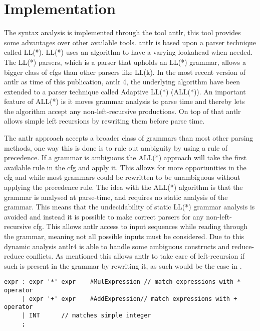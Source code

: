 
\section{Implementation}\label{sec:ANTLR}
The syntax analysis is implemented through the tool \acrfull{antlr}, this tool provides some advantages over other available tools.
\acrshort{antlr} is based upon a parser technique called LL(*).
LL(*) uses an algorithm to have a varying lookahead when needed.
The LL(*) parsers, which is a parser that upholds an LL(*) grammar, allows a bigger class of \acrshort{cfg}s than other parsers like LL(k).
In the most recent version of \acrshort{antlr} as time of this publication, \acrshort{antlr} 4, the underlying algorithm have been extended to a parser technique called Adaptive LL(*) (ALL(*)).
An important feature of ALL(*) is it moves grammar analysis to parse time and thereby lets the algorithm accept any non-left-recursive productions.
On top of that \acrshort{antlr} allows simple left recursions by rewriting them before parse time.

The \acrshort{antlr} approach accepts a broader class of grammars than most other parsing methods, one way this is done is to rule out ambiguity by using a rule of precedence.
If a grammar is ambiguous the ALL(*) approach will take the first  available rule in the \acrshort{cfg} and apply it.
This allows for more opportunities in the \acrshort{cfg} and while most grammars could be rewritten to be unambiguous without applying the precedence rule.
The idea with the ALL(*) algorithm is that the grammar is analysed  at parse-time, and requires no static analysis of the grammar. 
This means that the undecidability of static LL(*) grammar analysis is avoided and instead it is possible to make correct parsers for any non-left-recursive \acrshort{cfg}.
This allows \acrshort{antlr} access to input sequences while reading through the grammar, meaning not all possible inputs must be considered.
Due to this dynamic analysis \acrshort{antlr}4 is able to handle some ambiguous constructs and reduce-reduce conflicts.
As mentioned this allows \acrshort{antlr} to take care of left-recursion if such is present in the grammar by rewriting it, as such would be the case in .

\begin{lstlisting}[caption=An ambiguous rule for expr,frame=tlrb,label={lst:amb}]
expr : expr '*' expr 	#MulExpression // match expressions with * operator
     | expr '+' expr 	#AddExpression// match expressions with + operator
     | INT 		// matches simple integer
     ;
\end{lstlisting}

